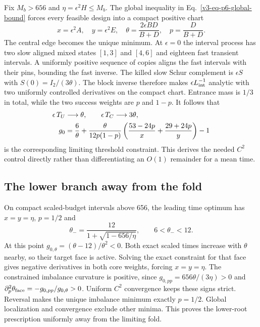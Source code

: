\documentclass[aps,pre,reprint,amsmath,amssymb,longbibliography]{revtex4-2}
\begin{document}
Fix $M_b>656$ and $\eta=\epsilon^2H\le M_b$. The global inequality in
Eq.~\eqref{v3-eq-p6-global-bound} forces every feasible design into a compact
positive chart
\begin{equation}
 x=\epsilon^2A,\quad y=\epsilon^2E,\quad
 \theta=\frac{2\epsilon BD}{B+D},\quad p=\frac D{B+D}.
 \label{eq:v4-time-chart}
\end{equation}
The central edge becomes the unique minimum. At $\epsilon=0$ the
interval process has two slow aligned mixed states $[1,3]$ and $[4,6]$
and eighteen fast transient intervals. A uniformly positive sequence of
copies aligns the fast intervals with their pins, bounding the fast
inverse. The killed slow Schur complement is $\epsilon S$ with
$S(0)=I_2/(3\theta)$. The block inverse therefore makes
$\epsilon L_{\rm int}^{-1}$ analytic with two uniformly controlled
derivatives on the compact chart. Entrance mass is $1/3$ in total,
while the two success weights are $p$ and $1-p$. It follows that
 \begin{align}
 \epsilon \,T_U&\longrightarrow\theta,\qquad
 \epsilon\, T_C\longrightarrow3\theta,  \label{eq:v4-time-leading}\\
 g_0&=\frac6\theta+
 \frac{\theta}{12p(1-p)}
 \left(\frac{53-24p}{x}+\frac{29+24p}{y}\right)-1 \notag
 \end{align}
is the corresponding limiting threshold constraint. This derives the
needed $C^2$ control directly rather than differentiating an $O(1)$
remainder for a mean time.

\subsection{The lower branch away from the fold}
On compact scaled-budget intervals above 656, the leading time optimum
has $x=y=\eta$, $p=1/2$ and
\begin{equation}
 \theta_- =\frac{12}{1+\sqrt{1-656/\eta}},\qquad
 6<\theta_-<12.
 \label{eq:v4-time-lower-root}
\end{equation}
At this point $g_{0,\theta}=(\theta-12)/\theta^2<0$.
Both exact scaled times increase with $\theta$ nearby, so their target
face is active. Solving the exact constraint for that face gives
negative derivatives in both core weights, forcing $x=y=\eta$.
The constrained imbalance curvature is positive, since
$g_{0,pp}=656\theta/(3\eta)>0$ and
$\partial_p^2\theta_{\rm face}=-g_{0,pp}/g_{0,\theta}>0$.
Uniform $C^2$ convergence keeps these signs strict. Reversal makes the
unique imbalance minimum exactly $p=1/2$. Global localization and
convergence exclude other minima. This proves the lower-root
prescription uniformly away from the limiting fold.
\end{document}
